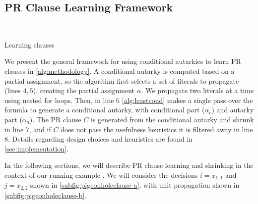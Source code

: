 \subsection{PR Clause Learning Framework}~\label{subsec:methodology}

\begin{algorithm}\caption{Learning \pr clauses}\label{alg:methodology}
    \SetAlgoNoLine
\end{algorithm}

We present the general framework for using conditional autarkies to learn PR clauses in \autoref{alg:methodology}. 
A conditional autarky is computed based on a partial assignment, 
so the algorithm first selects a set of literals to propagate (lines $4,5$), creating the partial assignment $\alpha$.
We propagate two literals at a time using nested for loops. 
Then, in line $6$ \autoref{alg:leastcond} makes a single pass over the formula to generate a conditional autarky, with conditional part ($\alpha_c$) and autarky part ($\alpha_a$).
The PR clause $C$ is generated from the conditional autarky and shrunk in line $7$, and if $C$ does not pass the usefulness heuristics it is filtered away in line $8$. 
Details regarding design choices and heuristics are found in \autoref{sec:implementation}.

In the following sections, we will describe PR clause learning and shrinking in the context of our running example  .
We will consider the decisions $i = x_{1, 1}$ and $j = x_{2, 2}$ shown in \autoref{subfig:pigeonholeclause-a}, with unit propagation shown in \autoref{subfig:pigeonholeclause-b}.

